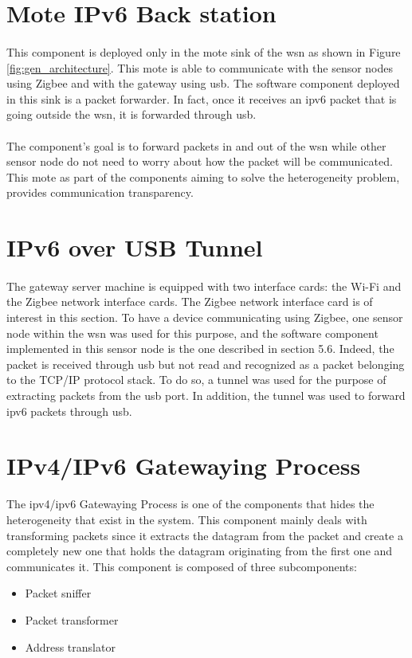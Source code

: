 \documentclass[12pt,a4paper,final]{report}
\begin{document}
\section{Mote IPv6 Back station}
\paragraph{} 
This component is deployed only in the mote sink of the \gls{wsn} as shown in Figure \ref{fig:gen_architecture}. This mote is able to communicate with the sensor nodes using Zigbee and with the gateway using \gls{usb}. The software component deployed in this sink is a packet forwarder. In fact, once it receives an \gls{ipv6} packet that is going outside the \gls{wsn}, it is forwarded through \gls{usb}.
\paragraph{}
The component's goal is to forward packets in and out of the \gls{wsn} while other sensor node do not need to worry about how the packet will be communicated. This mote as part of the components aiming to solve the heterogeneity problem, provides communication transparency.

\section{IPv6 over USB Tunnel}
\paragraph{}
The gateway server machine is equipped with two interface cards: the Wi-Fi and the Zigbee network interface cards. The Zigbee network interface card is of interest in this section. To have a device communicating using Zigbee, one sensor node within the \gls{wsn} was used for this purpose, and the software component implemented in this sensor node is the one described in section 5.6. Indeed, the packet is received through \gls{usb} but not read and recognized as a packet belonging to the TCP/IP protocol stack. To do so, a tunnel was used for the purpose of extracting packets from the \gls{usb} port. In addition, the tunnel was used to forward \gls{ipv6} packets through \gls{usb}.

\section{IPv4/IPv6 Gatewaying Process}
The \gls{ipv4}/\gls{ipv6} Gatewaying Process is one of the components that hides the heterogeneity that exist in the system. This component mainly deals with transforming packets since it extracts the datagram from the packet and create a completely new one that holds the datagram originating from the first one and communicates it. This component is composed of three subcomponents:
\begin{itemize}
\item Packet sniffer
\item Packet transformer
\item Address translator
\end{itemize}
\end{document}
